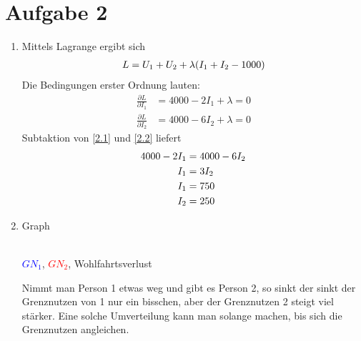 \documentclass{article}
\begin{document}
	\section*{Aufgabe 2}
	\begin{enumerate}[label=(\alph*)]
		\item Mittels Lagrange ergibt sich
		\begin{align}
			L = U_1 + U_2 + \lambda(I_1 + I_2 - 1000) \notag
		\end{align}
		Die Bedingungen erster Ordnung lauten:
		\begin{align}
			\label{2.1}
			\frac{\partial L}{\partial I_1} &= 4000-2I_1 + \lambda = 0 \tag{2.1} \\
			\label{2.2}
			\frac{\partial L}{\partial I_2} &= 4000-6I_2 + \lambda = 0 \tag{2.2}
		\end{align}
		Subtaktion von \eqref{2.1} und \eqref{2.2} liefert
		\begin{align}
			4000-2I_1 &= 4000-6I_2 \notag \\
			I_1 &= 3I_2 \notag \\
			I_1 &= 750 \notag \\
			I_2 &= 250 \notag
		\end{align}
		\item Graph
		\begin{center}
			 \\
			\textcolor{blue}{$GN_1$}, \textcolor{red}{$GN_2$}, \textcolor{green!80!black}{Wohlfahrtsverlust}
		\end{center}
		Nimmt man Person 1 etwas weg und gibt es Person 2, so sinkt der sinkt der Grenznutzen von 1 nur ein bisschen, aber der Grenznutzen 2 steigt viel stärker. Eine solche Umverteilung kann man solange machen, bis sich die Grenznutzen angleichen.
	\end{enumerate}
\end{document}
